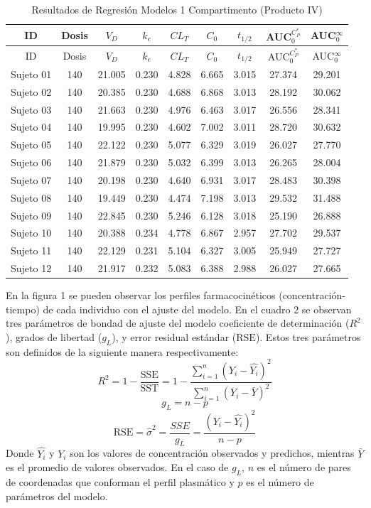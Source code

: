 \documentclass[]{article}
\begin{document}
\begin{longtable}[]{@{}ccccccccc@{}}
\caption{Resultados de Regresión Modelos 1 Compartimento (Producto
IV)}\tabularnewline
\toprule
ID & Dosis & \(V_{D}\) & \(k_{e}\) & \(CL_{T}\) & \(C_{0}\) &
\(t_{1/2}\) & AUC\(_{0}^{C_{P}^{*}}\) &
AUC\(_{0}^{\infty}\)\tabularnewline
\midrule
\endfirsthead
\toprule
ID & Dosis & \(V_{D}\) & \(k_{e}\) & \(CL_{T}\) & \(C_{0}\) &
\(t_{1/2}\) & AUC\(_{0}^{C_{P}^{*}}\) &
AUC\(_{0}^{\infty}\)\tabularnewline
\midrule
\endhead
Sujeto 01 & 140 & 21.005 & 0.230 & 4.828 & 6.665 & 3.015 & 27.374 &
29.201\tabularnewline
Sujeto 02 & 140 & 20.385 & 0.230 & 4.688 & 6.868 & 3.013 & 28.192 &
30.062\tabularnewline
Sujeto 03 & 140 & 21.663 & 0.230 & 4.976 & 6.463 & 3.017 & 26.556 &
28.341\tabularnewline
Sujeto 04 & 140 & 19.995 & 0.230 & 4.602 & 7.002 & 3.011 & 28.720 &
30.632\tabularnewline
Sujeto 05 & 140 & 22.122 & 0.230 & 5.077 & 6.329 & 3.019 & 26.027 &
27.770\tabularnewline
Sujeto 06 & 140 & 21.879 & 0.230 & 5.032 & 6.399 & 3.013 & 26.265 &
28.004\tabularnewline
Sujeto 07 & 140 & 20.198 & 0.230 & 4.640 & 6.931 & 3.017 & 28.483 &
30.398\tabularnewline
Sujeto 08 & 140 & 19.449 & 0.230 & 4.474 & 7.198 & 3.013 & 29.532 &
31.488\tabularnewline
Sujeto 09 & 140 & 22.845 & 0.230 & 5.246 & 6.128 & 3.018 & 25.190 &
26.888\tabularnewline
Sujeto 10 & 140 & 20.388 & 0.234 & 4.778 & 6.867 & 2.957 & 27.702 &
29.537\tabularnewline
Sujeto 11 & 140 & 22.129 & 0.231 & 5.104 & 6.327 & 3.005 & 25.949 &
27.727\tabularnewline
Sujeto 12 & 140 & 21.917 & 0.232 & 5.083 & 6.388 & 2.988 & 26.027 &
27.665\tabularnewline
\bottomrule
\end{longtable}

En la figura 1 se pueden observar los perfiles farmacocinéticos
(concentración-tiempo) de cada individuo con el ajuste del modelo. En el
cuadro 2 se observan tres parámetros de bondad de ajuste del modelo
coeficiente de determinación (\(R^{2}\)), grados de libertad
(\(g_{L}\)), y error residual estándar (\(\textrm{RSE}\)). Estos tres
parámetros son definidos de la siguiente manera respectivamente:\\
\[R^{2} = 1 - \frac{\textrm{SSE}}{\textrm{SST}} =1-\frac{\sum_{i=1}^{n}{\left(Y_{i}-\hat{Y_{i}}\right)^{2}}}{\sum_{i=1}^{n}{\left(Y_{i}-\bar{Y}\right)^{2}}}\]
\[g_{L} = n-p\]
\[\textrm{RSE} = \hat{\sigma}^2 = \frac{SSE}{g_{L}} = \frac{\left(Y_{i}-\hat{Y_{i}}\right)^2}{n-p}\]
Donde \(\hat{Y_{i}}\) y \(Y_{i}\) son los valores de concentración
observados y predichos, mientras \(\bar{Y}\) es el promedio de valores
observados. En el caso de \(g_{L}\), \(n\) es el número de pares de
coordenadas que conforman el perfil plasmático y \(p\) es el número de
parámetros del modelo.
\end{document}
